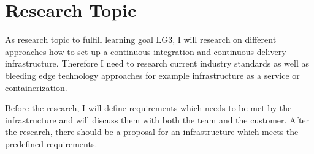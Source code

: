 \section{Research Topic}
\label{sec:research}


As research topic to fulfill learning goal LG3, I will research on different approaches how to set up a continuous integration and continuous delivery infrastructure.
Therefore I need to research current industry standards as well as bleeding edge technology approaches for example infrastructure as a service or containerization.

Before the research, I will define requirements which needs to be met by the infrastructure and will discuss them with both the team and the customer.
After the research, there should be a proposal for an infrastructure which meets the predefined requirements.